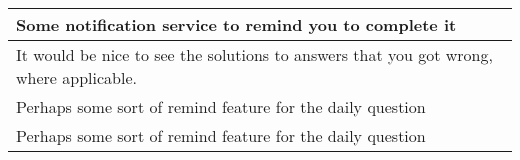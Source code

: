 \begin{longtable}{|p{1\linewidth}|}
		\hline
		Some notification service to remind you to complete it                                                                                                                                                                                                                                                                                                                                                                                                                                                                                                                                                                                                                                           \\
		\hline
		It would be nice to see the solutions to answers that you got wrong, where applicable.                                                                                                                                                                                                                                                                                                                                                                                                                                                                                                                                                                                                           \\
		\hline
		Perhaps some sort of remind feature for the daily question                                                                                                                                                                                                                                                                                                                                                                                                                                                                                                                                                                                                                                       \\
		\hline
		Perhaps some sort of remind feature for the daily question                                                                                                                                                                                                                                                                                                                                                                                                                                                                                                                                                                                                                                       \\

\end{longtable}
